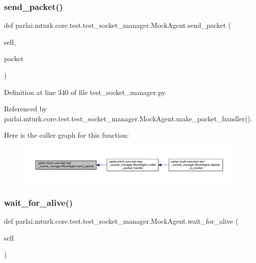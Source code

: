 \subsubsection{\texorpdfstring{send\+\_\+packet()}{send\_packet()}}
{\footnotesize\ttfamily def parlai.\+mturk.\+core.\+test.\+test\+\_\+socket\+\_\+manager.\+Mock\+Agent.\+send\+\_\+packet (\begin{DoxyParamCaption}\item[{}]{self,  }\item[{}]{packet }\end{DoxyParamCaption})}



Definition at line 340 of file test\+\_\+socket\+\_\+manager.\+py.



Referenced by parlai.\+mturk.\+core.\+test.\+test\+\_\+socket\+\_\+manager.\+Mock\+Agent.\+make\+\_\+packet\+\_\+handler().

Here is the caller graph for this function\+:
\nopagebreak
\begin{figure}[H]
\begin{center}
\leavevmode
\includegraphics[width=350pt]{classparlai_1_1mturk_1_1core_1_1test_1_1test__socket__manager_1_1MockAgent_a8093cf5f5ce398010769e21ab23e2859_icgraph}
\end{center}
\end{figure}
\mbox{\label{classparlai_1_1mturk_1_1core_1_1test_1_1test__socket__manager_1_1MockAgent_afb67694efb9a09d70b0d73eceae3a702}} 
\subsubsection{\texorpdfstring{wait\+\_\+for\+\_\+alive()}{wait\_for\_alive()}}
{\footnotesize\ttfamily def parlai.\+mturk.\+core.\+test.\+test\+\_\+socket\+\_\+manager.\+Mock\+Agent.\+wait\+\_\+for\+\_\+alive (\begin{DoxyParamCaption}\item[{}]{self }\end{DoxyParamCaption})}



